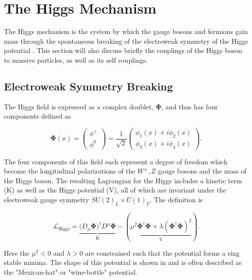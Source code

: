 \section{The Higgs Mechanism} \label{sec:theory:higgs}

The Higgs mechanism is the system by which the gauge bosons and fermions gain
mass through the spontaneous breaking of the electroweak symmetry of the Higgs
potential \cite{Higgs:1964ia,Higgs:1966ev,Thomson:2013zua}.  This section will
also discuss briefly the couplings of the Higgs boson to massive particles, as
well as its self couplings.

\subsection{Electroweak Symmetry Breaking}

The Higgs field is expressed as a complex doublet, $\boldsymbol{\Phi}$, and thus
has four components defined as

\begin{equation} \label{eq:higgs:higgs_field}
\boldsymbol{\Phi}(x) = \left( \begin{matrix} \phi^{+} \\ \phi^{0} \end{matrix}
\right) = \frac{1}{\sqrt{2}} \left( \begin{matrix} \phi_{1}(x) + i\phi_{2}(x) \\
\phi_{3}(x) + i\phi_{4}(x) \end{matrix} \right).
\end{equation}

The four components of this field each represent a degree of freedom which
become the longitudinal polarizations of the $W^{\pm},Z$ gauge bosons and the
mass of the Higgs boson.  The resulting Lagrangian for the Higgs includes a
kinetic term (K) as well as the Higgs potential (V), all of which are invariant
under the electroweak gauge symmetry $SU(2)_L \times U(1)_Y$.  The definition is

\begin{equation} \label{eq:higgs:lagrangian}
\mathcal{L}_{\text{Higgs}} =
\underbrace{(D_{\mu}\boldsymbol{\Phi)^{\dagger}}D^{\mu}\boldsymbol{\Phi}}_{\text{K}}
- (\underbrace{\mu^{2}\boldsymbol{\Phi}^{\dagger}\boldsymbol{\Phi} +
  \lambda(\boldsymbol{\Phi}^{\dagger}\boldsymbol{\Phi})^{2}}_{\text{V}}).
\end{equation}

Here the $\mu^{2} < 0$ and $\lambda > 0$ are constrained such that the
potential forms a ring stable minima.  The shape of this potential is shown in
 and is often described as the "Mexican-hat" or
"wine-bottle" potential. 

